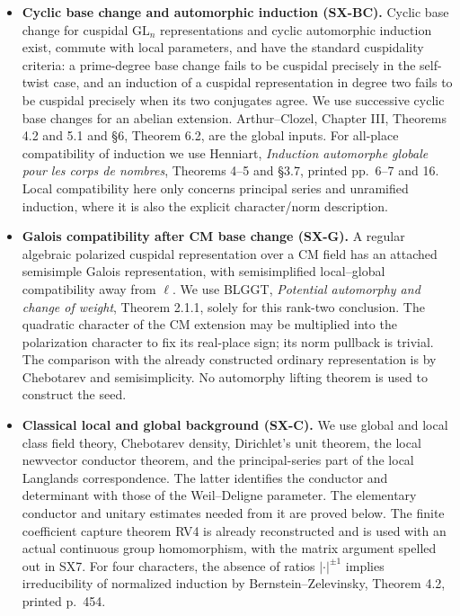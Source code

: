 \begin{itemize}
\item \textbf{Cyclic base change and automorphic induction (SX-BC).}
Cyclic base change for cuspidal $\mathrm{GL}_n$ representations and
cyclic automorphic induction exist, commute with local parameters,
and have the standard cuspidality criteria: a prime-degree base change
fails to be cuspidal precisely in the self-twist case, and an induction
of a cuspidal representation in degree two fails to be cuspidal
precisely when its two conjugates agree.  We use successive cyclic
base changes for an abelian extension.  Arthur--Clozel, Chapter III,
Theorems 4.2 and 5.1 and \S6, Theorem 6.2, are the global inputs.
For all-place compatibility of induction we use Henniart,
\emph{Induction automorphe globale pour les corps de nombres},
Theorems 4--5 and \S3.7, printed pp.~6--7 and 16.
Local compatibility here only concerns principal series and unramified
induction, where it is also the explicit character/norm description.

\item \textbf{Galois compatibility after CM base change (SX-G).}
A regular algebraic polarized cuspidal representation over a CM field
has an attached semisimple Galois representation, with semisimplified
local--global compatibility away from $\ell$.
We use BLGGT, \emph{Potential automorphy and change of weight},
Theorem 2.1.1, solely for this rank-two conclusion.
The quadratic character of the CM extension may be multiplied into
the polarization character to fix its real-place sign; its norm
pullback is trivial.  The comparison with the already constructed
ordinary representation is by Chebotarev and semisimplicity.
No automorphy lifting theorem is used to construct the seed.

\item \textbf{Classical local and global background (SX-C).}
We use global and local class field theory, Chebotarev density,
Dirichlet's unit theorem, the local newvector conductor theorem,
and the principal-series part of the local Langlands correspondence.
The latter identifies the conductor and determinant with those of
the Weil--Deligne parameter.  The elementary conductor and unitary
estimates needed from it are proved below.  The finite coefficient
capture theorem RV4 is already reconstructed and is used with an
actual continuous group homomorphism, with the matrix argument
spelled out in SX7.  For four characters, the absence of ratios
$|\cdot|^{\pm1}$ implies irreducibility of normalized induction
by Bernstein--Zelevinsky, Theorem 4.2, printed p.~454.
\end{itemize}

